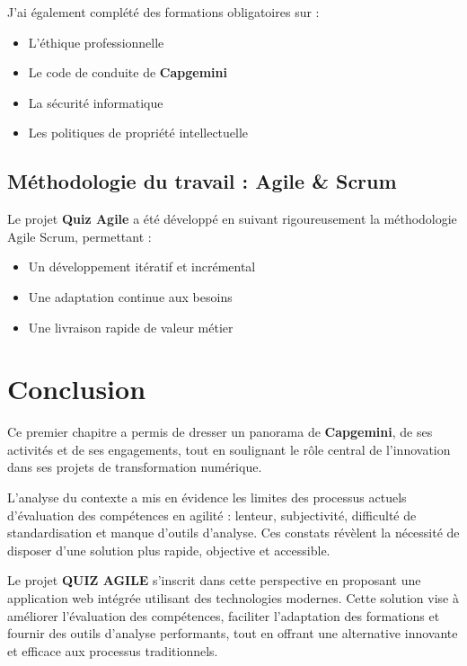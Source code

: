 \documentclass[12pt,a4paper]{report}
\begin{document}
J'ai également complété des formations obligatoires sur :
\begin{itemize}
\item L'éthique professionnelle
\item Le code de conduite de \textbf{Capgemini}
\item La sécurité informatique
\item Les politiques de propriété intellectuelle
\end{itemize}

\subsection{Méthodologie du travail : Agile \& Scrum}

Le projet \textbf{Quiz Agile} a été développé en suivant rigoureusement la méthodologie Agile Scrum, permettant :
\begin{itemize}
\item Un développement itératif et incrémental
\item Une adaptation continue aux besoins
\item Une livraison rapide de valeur métier
\end{itemize}

\cleardoublepage
\section{Conclusion}

Ce premier chapitre a permis de dresser un panorama de \textbf{Capgemini}, de ses activités et de ses engagements, tout en soulignant le rôle central de l'innovation dans ses projets de transformation numérique.

L'analyse du contexte a mis en évidence les limites des processus actuels d'évaluation des compétences en agilité : lenteur, subjectivité, difficulté de standardisation et manque d'outils d'analyse. Ces constats révèlent la nécessité de disposer d'une solution plus rapide, objective et accessible.

Le projet \textbf{QUIZ AGILE} s'inscrit dans cette perspective en proposant une application web intégrée utilisant des technologies modernes. Cette solution vise à améliorer l'évaluation des compétences, faciliter l'adaptation des formations et fournir des outils d'analyse performants, tout en offrant une alternative innovante et efficace aux processus traditionnels.

\end{document}
